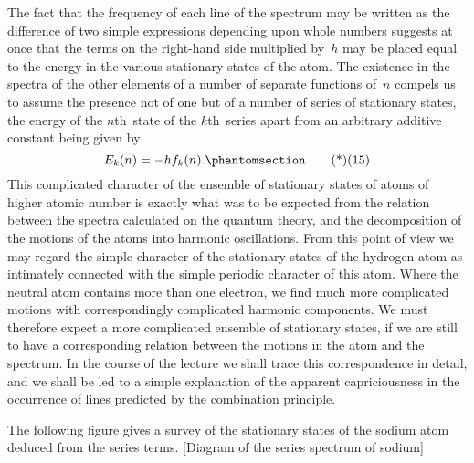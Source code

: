 The fact that the frequency of each line of the spectrum may be
written as the difference of two simple expressions depending upon
whole numbers suggests at once that the terms on the right-hand
side multiplied by~$h$ may be placed equal to the energy in the
various stationary states of the atom. The existence in the spectra
of the other elements of a number of separate functions of~$n$ compels
us to assume the presence not of one but of a number of series of
stationary states, the energy of the $n$th~state of the $k$th~series apart
from an arbitrary additive constant being given by
\[
E_{k}(n) = -h f_{k}(n).
\Tag{(15)}
\]
This complicated character of the ensemble of stationary states of
atoms of higher atomic number is exactly what was to be expected
from the relation between the spectra calculated on the quantum
theory, and the decomposition of the motions of the atoms into
harmonic oscillations. From this point of view we may regard the
simple character of the stationary states of the hydrogen atom as
intimately connected with the simple periodic character of this
atom. Where the neutral atom contains more than one electron, we
find much more complicated motions with correspondingly complicated
harmonic components. We must therefore expect a more
complicated ensemble of stationary states, if we are still to have a
corresponding relation between the motions in the atom and the
spectrum. In the course of the lecture we shall trace this correspondence
in detail, and we shall be led to a simple explanation of
the apparent capriciousness in the occurrence of lines predicted by
the combination principle.

The following figure gives a survey of the stationary states of
the sodium atom deduced from the series terms.
[Diagram of the series spectrum of sodium]

